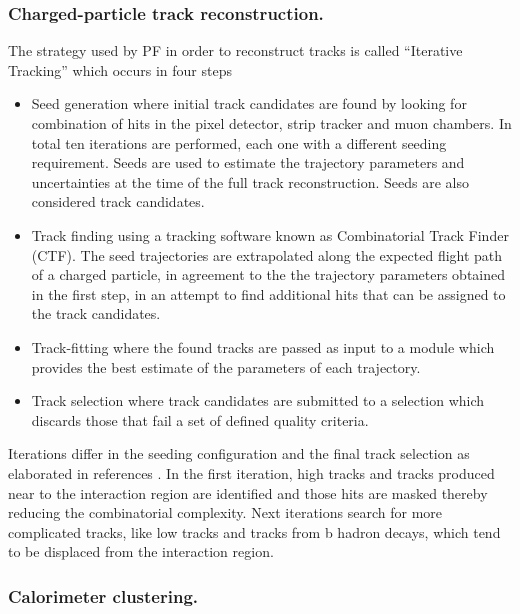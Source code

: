 \subsubsection*{Charged-particle track reconstruction.}

\noindent The strategy used by PF in order to reconstruct tracks is called ``Iterative Tracking'' which occurs in four steps

\begin{itemize}
\item Seed generation where initial track candidates are found by looking for combination of hits in the pixel detector, strip tracker and muon chambers. In total ten iterations are performed, each one with a different seeding requirement. Seeds are used to estimate the trajectory parameters and uncertainties at the time of the full track reconstruction. Seeds are also considered track candidates.    
\item Track finding using a tracking software known as Combinatorial Track Finder (CTF)\cite{ctf}. The seed trajectories are extrapolated along the expected flight path of a charged particle, in agreement to the the trajectory parameters obtained in the first step, in an attempt to find additional hits that can be assigned to the track candidates. 
\item Track-fitting where the found tracks are passed as input to a module which provides the best estimate of the parameters of each trajectory.
\item Track selection where track candidates are submitted to a selection which discards those that fail a set of defined quality criteria.
\end{itemize}

\noindent Iterations differ in the seeding configuration and the final track selection as elaborated in references \cite{particle_flow, particle_flow2}. In the first iteration, high \pt tracks and tracks produced near to the interaction region are identified and those hits are masked thereby reducing the combinatorial complexity. Next iterations search for more complicated tracks, like low \pt tracks and tracks from b hadron decays, which tend to be displaced from the interaction region.

\subsubsection*{Calorimeter clustering.}

